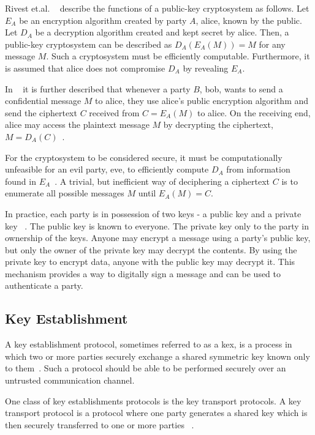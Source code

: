 Rivest et.al. ~\cite{rsa1977} describe the functions of a public-key cryptosystem as follows. Let $E_A$ be an encryption algorithm created by party $A$, \gls{alice}, known by the public. Let $D_A$ be a decryption algorithm created and kept secret by \gls{alice}. Then, a public-key cryptosystem can be described as $D_A(E_A(M))=M$ for any message $M$. Such a cryptosystem must be efficiently computable. Furthermore, it is assumed that \gls{alice} does not compromise $D_A$ by revealing $E_A$.

In ~\cite{rsa1977} it is further described that whenever a party $B$, \gls{bob}, wants to send a confidential message $M$ to \gls{alice}, they use \gls{alice}'s public encryption algorithm and send the ciphertext $C$ received from $C=E_A(M)$ to \gls{alice}. On the receiving end, \gls{alice} may access the plaintext message $M$ by decrypting the ciphertext, $M=D_A(C)$~\cite{rsa1977}.

For the cryptosystem to be considered secure, it must be computationally unfeasible for an evil party, \gls{eve}, to efficiently compute $D_A$ from information found in $E_A$~\cite{rsa1977}. A trivial, but inefficient way of deciphering a ciphertext $C$ is to enumerate all possible messages $M$ until $E_A(M)=C$.

In practice, each party is in possession of two keys - a public key and a private key ~\cite{bernstein2017}. The public key is known to everyone. The private key only to the party in ownership of the keys. Anyone may encrypt a message using a party's public key, but only the owner of the private key may decrypt the contents. By using the private key to encrypt data, anyone with the public key may decrypt it. This mechanism provides a way to digitally sign a message and can be used to authenticate a party.

\subsection{Key Establishment}

A key establishment protocol, sometimes referred to as a \acrfull{kex}, is a process in which two or more parties securely exchange a shared symmetric key known only to them~\cite{boyd2020}. Such a protocol should be able to be performed securely over an untrusted communication channel.

One class of key establishments protocols is the key transport protocols. A key transport protocol is a protocol where one party generates a shared key which is then securely transferred to one or more parties ~\cite{boyd2020}.

